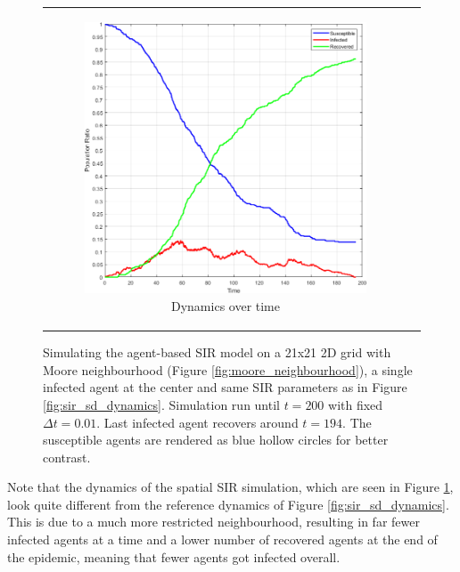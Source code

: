 \begin{figure}
\begin{center}
\begin{tabular}{c c}
		\begin{subfigure}[b]{0.43\textwidth}
			\centering
			\includegraphics[width=1\textwidth, angle=0]{./fig/timedriven/SIR_Dunai/SIR_Dunai_dt001.png}
			\caption{Dynamics over time}
			\label{fig:sir_dunai_env_dynamics}
		\end{subfigure}
	\end{tabular}
	
	\caption{Simulating the agent-based SIR model on a 21x21 2D grid with Moore neighbourhood (Figure \ref{fig:moore_neighbourhood}), a single infected agent at the center and same SIR parameters as in Figure \ref{fig:sir_sd_dynamics}. Simulation run until $t = 200$ with fixed $\Delta t = 0.01$. Last infected agent recovers around $t = 194$. The susceptible agents are rendered as blue hollow circles for better contrast.}
	\label{fig:sir_dunai}
\end{center}
\end{figure}

Note that the dynamics of the spatial SIR simulation, which are seen in Figure \ref{fig:sir_dunai_env_dynamics}, look quite different from the reference dynamics of Figure \ref{fig:sir_sd_dynamics}. This is due to a much more restricted neighbourhood, resulting in far fewer infected agents at a time and a lower number of recovered agents at the end of the epidemic, meaning that fewer agents got infected overall.

